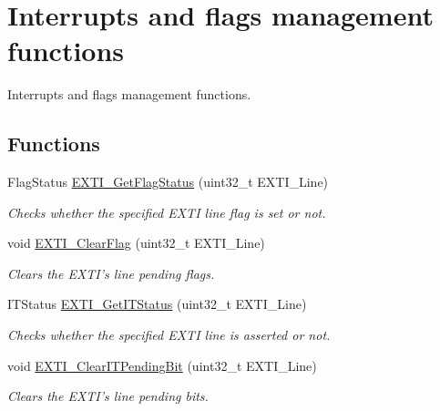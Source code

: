 \hypertarget{group___e_x_t_i___group2}{\section{Interrupts and flags management functions}
\label{group___e_x_t_i___group2}
}


Interrupts and flags management functions.  


\subsection*{Functions}
\begin{DoxyCompactItemize}
\item 
Flag\-Status \hyperlink{group___e_x_t_i___group2_ga0ce06e6b312592df149800d63218cffa}{E\-X\-T\-I\-\_\-\-Get\-Flag\-Status} (uint32\-\_\-t E\-X\-T\-I\-\_\-\-Line)
\begin{DoxyCompactList}\small\item\em Checks whether the specified E\-X\-T\-I line flag is set or not. \end{DoxyCompactList}\item 
void \hyperlink{group___e_x_t_i___group2_ga8e07aaaa286dea4803605d5968850a92}{E\-X\-T\-I\-\_\-\-Clear\-Flag} (uint32\-\_\-t E\-X\-T\-I\-\_\-\-Line)
\begin{DoxyCompactList}\small\item\em Clears the E\-X\-T\-I's line pending flags. \end{DoxyCompactList}\item 
I\-T\-Status \hyperlink{group___e_x_t_i___group2_gaf7b51519062ae42fd27ee689cab364aa}{E\-X\-T\-I\-\_\-\-Get\-I\-T\-Status} (uint32\-\_\-t E\-X\-T\-I\-\_\-\-Line)
\begin{DoxyCompactList}\small\item\em Checks whether the specified E\-X\-T\-I line is asserted or not. \end{DoxyCompactList}\item 
void \hyperlink{group___e_x_t_i___group2_ga3652a7e682728b310c124e7e974d1468}{E\-X\-T\-I\-\_\-\-Clear\-I\-T\-Pending\-Bit} (uint32\-\_\-t E\-X\-T\-I\-\_\-\-Line)
\begin{DoxyCompactList}\small\item\em Clears the E\-X\-T\-I's line pending bits. \end{DoxyCompactList}\end{DoxyCompactItemize}


